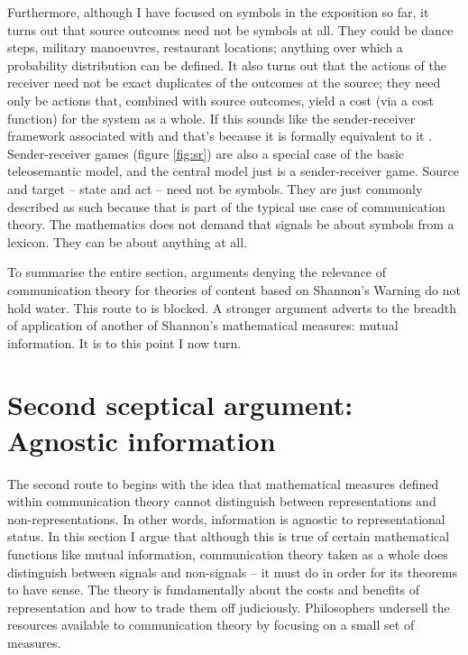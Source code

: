 \documentclass[12pt]{article}
\begin{document}
Furthermore, although I have focused on symbols in the exposition so far, it turns out that source outcomes need not be symbols at all.
They could be dance steps, military manoeuvres, restaurant locations; anything over which a probability distribution can be defined.
It also turns out that the actions of the receiver need not be exact duplicates of the outcomes at the source; they need only be actions that, combined with source outcomes, yield a cost (via a cost function) for the system as a whole.
If this sounds like the sender-receiver framework associated with \citet{skyrms2010signals} and \citet{lewis1969convention} that's because it is formally equivalent to it \citep{martinez2019deception}.
Sender-receiver games (figure \ref{fig:sr}) are also a special case of the basic teleosemantic model, and the central model just is a sender-receiver game.
Source and target -- state and act -- need not be symbols.
They are just commonly described as such because that is part of the typical use case of communication theory.
The mathematics does not demand that signals be about symbols from a lexicon.
They can be about anything at all.



To summarise the entire section, arguments denying the relevance of communication theory for theories of content based on {\sc Shannon's Warning} do not hold water.
This route to \tic{} is blocked.
A stronger argument adverts to the breadth of application of another of Shannon's mathematical measures: mutual information.
It is to this point I now turn.


\section{Second sceptical argument: Agnostic information}\label{sec:agnostic}

The second route to \tic{} begins with the idea that mathematical measures defined within communication theory cannot distinguish between representations and non-representations.
In other words, information is agnostic to representational status.
In this section I argue that although this is true of certain mathematical functions like mutual information, communication theory taken as a whole does distinguish between signals and non-signals -- it must do in order for its theorems to have sense.
The theory is fundamentally about the costs and benefits of representation and how to trade them off judiciously.
Philosophers undersell the resources available to communication theory by focusing on a small set of measures.
\end{document}
